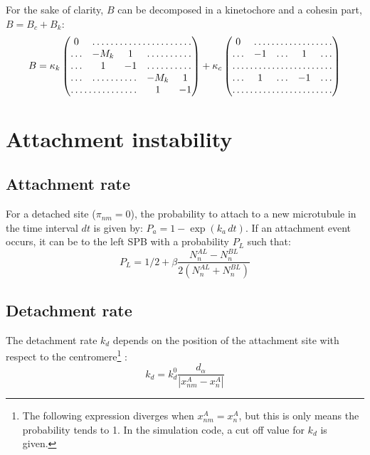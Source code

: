 \documentclass[a4paper,12pt]{article}
\begin{document}
For the sake of clarity, $B$ can be decomposed in a kinetochore and a
cohesin part, $B = B_c + B_k$:
\begin{equation}
  B = \kappa_k%
  \begin{pmatrix}
    \,0\, & \hdotsfor{4}\\
    \hdots &  - M_k  & 1 & \hdotsfor{2} \\
    \hdots & 1 & -1 &  \hdotsfor{2}\\
    \hdots &  \hdotsfor{2} & - M_k  & 1 \\
    \hdotsfor{3}  & 1 & - 1\\
  \end{pmatrix}
  + \kappa_c%
  \begin{pmatrix}
    \,0\, & \hdotsfor{4}\\
    \hdots & - 1 & \hdots & 1  & \hdots \\
    \hdotsfor{5}\\
    \hdots & 1 & \hdots & -1 & \hdots \\
    \hdotsfor{5}\\
  \end{pmatrix}
\end{equation}


\section{Attachment instability}

\subsection{Attachment rate}

For a detached site ($\pi_{nm} = 0$), the probability to attach to a
new microtubule in the time interval $dt$ is given by: $P_a = 1 -
\exp(k_a\,dt)$. If an attachment event occurs, it can be to the left
SPB with a probability $P_L$ such that:
\begin{equation}
  \label{eq:p_left}
  P_L =  1/2 + \beta \frac{N_n^{AL} - N_n^{BL}}{2(N_n^{AL} + N_n^{BL})}
\end{equation}

\subsection{Detachment rate}

The detachment rate $k_d$ depends on the position of the attachment
site with respect to the centromere\footnote{The following expression
  diverges when $ x_{nm}^A = x_n^A $, but this is only means the
  probability tends to 1. In the simulation code, a cut off value for
  $k_d$ is given.} :
\begin{equation}
  \label{eq:k_det}
  k_d = k_d^0 \frac{d_\alpha}{|x_{nm}^A - x_n^A|}
\end{equation}

\end{document}
